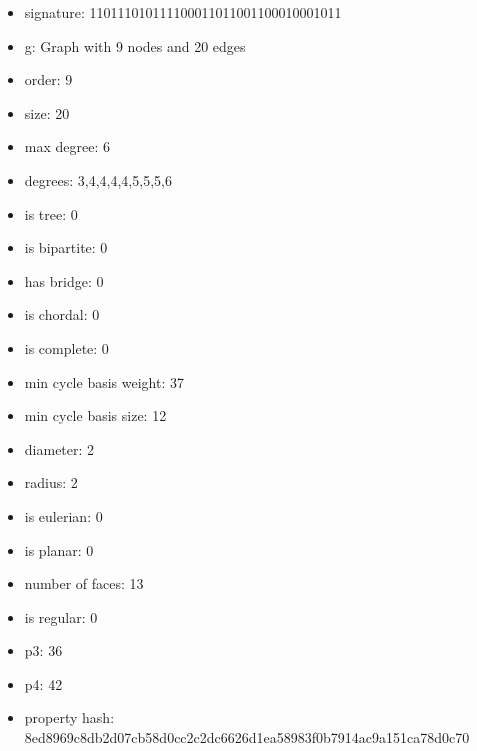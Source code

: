 \newpage
\begin{figure}
\end{figure}
\begin{itemize}
\item signature: 110111010111100011011001100010001011
\item g: Graph with 9 nodes and 20 edges
\item order: 9
\item size: 20
\item max degree: 6
\item degrees: 3,4,4,4,4,5,5,5,6
\item is tree: 0
\item is bipartite: 0
\item has bridge: 0
\item is chordal: 0
\item is complete: 0
\item min cycle basis weight: 37
\item min cycle basis size: 12
\item diameter: 2
\item radius: 2
\item is eulerian: 0
\item is planar: 0
\item number of faces: 13
\item is regular: 0
\item p3: 36
\item p4: 42
\item property hash: 8ed8969c8db2d07cb58d0cc2c2dc6626d1ea58983f0b7914ac9a151ca78d0c70
\end{itemize}
